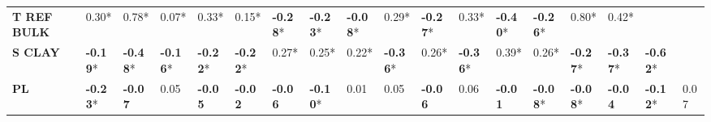 \documentclass[AutoFakeBold]{LZUThesis-PgD&PhD}
\begin{document}
\begin{landscape}
\begin{table}[H]
\begin{tabular}{p{1.6cm}p{0.68cm}p{0.68cm}p{0.68cm}p{0.68cm}p{0.68cm}p{0.68cm}p{0.68cm}p{0.68cm}p{0.68cm}p{0.68cm}p{0.68cm}p{0.68cm}p{0.68cm}p{0.68cm}p{0.68cm}p{0.68cm}p{0.68cm}}
				\textbf{T REF BULK} & 0.30* & 0.78* & 0.07* & 0.33* & 0.15* & \textbf{-0.28}* & \textbf{-0.23}* & \textbf{-0.08}* & 0.29* & \textbf{-0.27}* & 0.33* & \textbf{-0.40}* & \textbf{-0.26}* & 0.80* & 0.42* &  &  \\
				\textbf{S CLAY} & \textbf{-0.19}* & \textbf{-0.48}* & \textbf{-0.16}* & \textbf{-0.22}* & \textbf{-0.22}* & 0.27* & 0.25* & 0.22* & \textbf{-0.36}* & 0.26* & \textbf{-0.36}* & 0.39* & 0.26* & \textbf{-0.27}* & \textbf{-0.37}* & \textbf{-0.62}* &  \\
				\textbf{PL} & \textbf{-0.23}* & \textbf{-0.07} & 0.05 & \textbf{-0.05} & \textbf{-0.02} & \textbf{-0.06} & \textbf{-0.10}* & 0.01 & 0.05 & \textbf{-0.06} & 0.06 & \textbf{-0.01} & \textbf{-0.08}* & \textbf{-0.08}* & \textbf{-0.04} & \textbf{-0.12}* & 0.07 \\
				
			\end{tabular}
		\end{table}
	\end{landscape}  %
	
	
%		
%		
	
\end{document}
